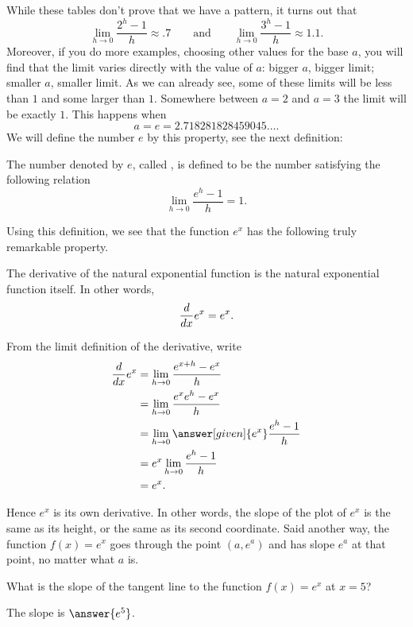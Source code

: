 \documentclass{ximera}
\begin{document}
While these tables don't prove that we have a pattern, it turns out that
\[
\lim_{h\to 0}\frac{2^h-1}{h} \approx .7 \qquad\text{and}\qquad \lim_{h\to 0} \frac{3^h-1}{h} \approx 1.1.
\]
Moreover, if you do more examples, choosing other values for the 
base $a$, you will find that the limit varies
directly with the value of $a$: bigger $a$, bigger limit; smaller $a$,
smaller limit. As we can already see, some of these limits will be
less than $1$ and some larger than $1$. Somewhere between $a=2$ and $a=3$
the limit will be exactly $1$. This happens when 
\[
a = e = 2.718281828459045\dots.
\]
We will define the number $e$ by this property, see the next
definition:
\begin{definition}
  The number denoted by $e$, called , is defined
  to be the number satisfying the following relation
  \[
  \lim_{h\to 0} \frac{e^h-1}{h} = 1.
  \]
\end{definition}
Using this definition, we see that the function $e^x$ has the following truly remarkable property.

\begin{theorem}
The derivative of the natural exponential function is the natural exponential function itself.  In other words,
\[
\frac{d}{\mathop{}\!d x} e^x = e^x.
\]
\begin{explanation}  
From the limit definition of the derivative, write
\begin{align*}
\ddx e^x&=\lim_{h\to 0} \frac{e^{x+h}-e^x}{h} \\
&=\lim_{h\to 0} \frac{e^xe^{h}-e^x}{h} \\
&=\lim_{h\to 0} \answer[given]{e^x}\frac{e^{h}-1}{h} \\
&=e^x\lim_{h\to 0} \frac{e^{h}-1}{h} \\
&=e^x.
\end{align*}
\end{explanation}
\end{theorem}


Hence $e^x$ is its own derivative. In other words, the slope of the
plot of $e^x$ is the same as its height, or the same as its second
coordinate.  Said another way, the function $f(x)=e^x$ goes through the point $(a,e^a)$
and has slope $e^a$ at that point, no matter what $a$ is. 

\begin{question}
  What is the slope of the tangent line to the function $f(x) = e^x$ at $x = 5$?
  \begin{prompt}
    The slope is $\answer{e^5}$.
  \end{prompt}
\end{question}
\end{document}
